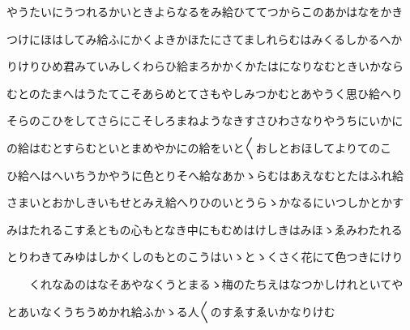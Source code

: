 \documentclass[a4paper,11pt,landscape]{ltjtarticle}
\begin{document}
\par\medskip
やうたいにうつれるかいときよらなるをみ給ひててつからこのあかはなをかき
\par\medskip
つけにほはしてみ給ふにかくよきかほたにさてましれらむはみくるしかるへか
\par\medskip
りけりひめ君みていみしくわらひ給まろかかくかたはになりなむときいかなら
\par\medskip
むとのたまへはうたてこそあらめとてさもやしみつかむとあやうく思ひ給へり
\par\medskip
そらのこひをしてさらにこそしろまねようなきすさひわさなりやうちにいかに
\par\medskip
の給はむとすらむといとまめやかにの給をいと〱おしとおほしてよりてのこ
\par\medskip
ひ給へはへいちうかやうに色とりそへ給なあかゝらむはあえなむとたはふれ給
\par\medskip
さまいとおかしきいもせとみえ給へりひのいとうらゝかなるにいつしかとかす
\par\medskip
みはたれるこすゑともの心もとなき中にもむめはけしきはみほゝゑみわたれる
\par\medskip
とりわきてみゆはしかくしのもとのこうはいゝとゝくさく花にて色つきにけり
\par\medskip
　　くれなゐのはなそあやなくうとまるゝ梅のたちえはなつかしけれといてや
\par\medskip
とあいなくうちうめかれ給ふかゝる人〱のすゑすゑいかなりけむ
\par\medskip
\end{document}
